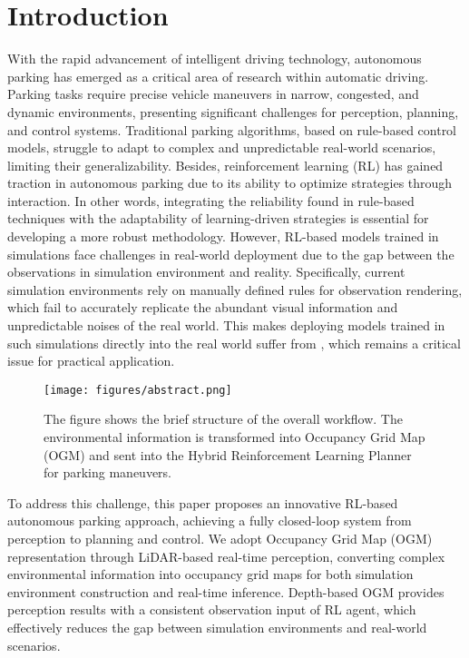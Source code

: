 \documentclass[ conference]{./support/ieeeconf}
\begin{document}
\section{Introduction}
With the rapid advancement of intelligent driving technology, autonomous parking has emerged as a critical area of research within automatic driving. 
Parking tasks require precise vehicle maneuvers in narrow, congested, and dynamic environments, presenting significant challenges for perception, planning, and control systems\cite{li2024parkinge2e}. 
Traditional parking algorithms, based on rule-based control models, struggle to adapt to complex and unpredictable real-world scenarios, limiting their generalizability. 
Besides, reinforcement learning (RL) has gained traction in autonomous parking due to its ability to optimize strategies through interaction. 
In other words, integrating the reliability found in rule-based techniques with the adaptability of learning-driven strategies is essential for developing a more robust methodology.
However, RL-based models trained in simulations face challenges in real-world deployment due to the gap between the observations in simulation environment and reality.
Specifically, current simulation environments rely on manually defined rules for observation rendering, which fail to accurately replicate the abundant visual information and unpredictable noises of the real world. This makes deploying models trained in such simulations directly into the real world suffer from \cite{robotics_sim2real_yu2024}, which remains a critical issue for practical application.


\begin{figure}[t]
	\centering
        \texttt{[image: figures/abstract.png]}
        \vspace{-0.6cm}
	\caption{The figure shows the brief structure of the overall workflow. The environmental information is transformed into Occupancy Grid Map (OGM) and sent into the Hybrid Reinforcement Learning Planner for parking maneuvers.}
	\label{fig:abs}
       \vspace{-0.6cm}
\end {figure}

{T}{o} address this challenge, this paper proposes an innovative RL-based autonomous parking approach, achieving a fully closed-loop system from perception to planning and control. 
We adopt Occupancy Grid Map (OGM) representation through LiDAR-based real-time perception, converting complex environmental information into occupancy grid maps for both simulation environment construction and real-time inference. 
Depth-based OGM provides perception results with a consistent observation input of RL agent, which effectively reduces the gap between simulation environments and real-world scenarios. 
\end{document}

